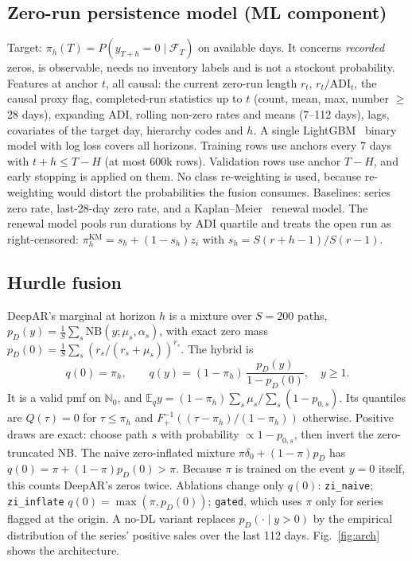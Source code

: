 \documentclass[conference]{IEEEtran}
\begin{document}
\subsection{Zero-run persistence model (ML component)}
Target: $\pi_h(T)=P(y_{T+h}=0\mid\mathcal F_T)$ on available days. It concerns \emph{recorded} zeros, is observable, needs no inventory labels and is not a stockout probability. Features at anchor $t$, all causal: the current zero-run length $r_t$, $r_t/\mathrm{ADI}_t$, the causal proxy flag, completed-run statistics up to $t$ (count, mean, max, number $\ge$28 days), expanding ADI, rolling non-zero rates and means (7--112 days), lags, covariates of the target day, hierarchy codes and $h$. A single LightGBM~\cite{ke2017} binary model with log loss covers all horizons. Training rows use anchors every 7 days with $t+h\le T-H$ (at most 600k rows). Validation rows use anchor $T-H$, and early stopping is applied on them. No class re-weighting is used, because re-weighting would distort the probabilities the fusion consumes. Baselines: series zero rate, last-28-day zero rate, and a Kaplan--Meier~\cite{kaplan1958} renewal model. The renewal model pools run durations by ADI quartile and treats the open run as right-censored: $\pi_h^{\mathrm{KM}}=s_h+(1-s_h)z_i$ with $s_h=S(r+h-1)/S(r-1)$.

\subsection{Hurdle fusion}\label{sec:fusion}
DeepAR's marginal at horizon $h$ is a mixture over $S=200$ paths, $p_D(y)=\frac1S\sum_s\mathrm{NB}(y;\mu_s,\alpha_s)$, with exact zero mass $p_D(0)=\frac1S\sum_s (r_s/(r_s+\mu_s))^{r_s}$. The hybrid is
\begin{equation}
q(0)=\pi_h,\qquad q(y)=(1-\pi_h)\,\frac{p_D(y)}{1-p_D(0)},\quad y\ge1.
\end{equation}
It is a valid pmf on $\mathbb N_0$, and $\mathbb E_q y=(1-\pi_h)\sum_s\mu_s/\sum_s(1-p_{0,s})$. Its quantiles are $Q(\tau)=0$ for $\tau\le\pi_h$ and $F_+^{-1}((\tau-\pi_h)/(1-\pi_h))$ otherwise. Positive draws are exact: choose path $s$ with probability $\propto 1-p_{0,s}$, then invert the zero-truncated NB. The naive zero-inflated mixture $\pi\delta_0+(1-\pi)p_D$ has $q(0)=\pi+(1-\pi)p_D(0)>\pi$. Because $\pi$ is trained on the event $y=0$ itself, this counts DeepAR's zeros twice. Ablations change only $q(0)$: \texttt{zi\_naive}; \texttt{zi\_inflate} $q(0)=\max(\pi,p_D(0))$; \texttt{gated}, which uses $\pi$ only for series flagged at the origin. A no-DL variant replaces $p_D(\cdot\mid y>0)$ by the empirical distribution of the series' positive sales over the last 112 days. Fig.~\ref{fig:arch} shows the architecture.
\end{document}
